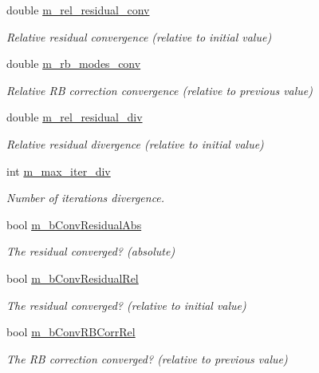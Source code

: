 \begin{DoxyCompactItemize}
double \hyperlink{classcarl_1_1_f_e_t_i___operations_a4d1bd14942397cc0cf91c4625f7482da}{m\+\_\+rel\+\_\+residual\+\_\+conv}
\begin{DoxyCompactList}\small\item\em Relative residual convergence (relative to initial value) \end{DoxyCompactList}\item 
double \hyperlink{classcarl_1_1_f_e_t_i___operations_a4e5cf9147182d2647b6379453a4ff10d}{m\+\_\+rb\+\_\+modes\+\_\+conv}
\begin{DoxyCompactList}\small\item\em Relative R\+B correction convergence (relative to previous value) \end{DoxyCompactList}\item 
double \hyperlink{classcarl_1_1_f_e_t_i___operations_ae5050693b56d9bc3a3794014485fcf04}{m\+\_\+rel\+\_\+residual\+\_\+div}
\begin{DoxyCompactList}\small\item\em Relative residual divergence (relative to initial value) \end{DoxyCompactList}\item 
int \hyperlink{classcarl_1_1_f_e_t_i___operations_ab8f236399e5565019be7dc8825bc00df}{m\+\_\+max\+\_\+iter\+\_\+div}
\begin{DoxyCompactList}\small\item\em Number of iterations divergence. \end{DoxyCompactList}\item 
bool \hyperlink{classcarl_1_1_f_e_t_i___operations_a06ed6c8995fd004aabe207d2a961029e}{m\+\_\+b\+Conv\+Residual\+Abs}
\begin{DoxyCompactList}\small\item\em The residual converged? (absolute) \end{DoxyCompactList}\item 
bool \hyperlink{classcarl_1_1_f_e_t_i___operations_a167cb3dd2732a038aa33da11b51b2d3b}{m\+\_\+b\+Conv\+Residual\+Rel}
\begin{DoxyCompactList}\small\item\em The residual converged? (relative to initial value) \end{DoxyCompactList}\item 
bool \hyperlink{classcarl_1_1_f_e_t_i___operations_a324e0a6913e912861b38449fb6c482b5}{m\+\_\+b\+Conv\+R\+B\+Corr\+Rel}
\begin{DoxyCompactList}\small\item\em The R\+B correction converged? (relative to previous value) \end{DoxyCompactList}\item 

\end{DoxyCompactItemize}
